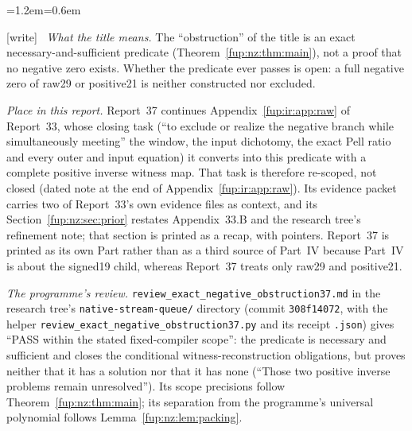 \documentclass[11pt,letterpaper]{article}
\theoremstyle{definition}\newtheorem{definition}[theorem]{Definition}
\theoremstyle{remark}\newtheorem{remark}[theorem]{Remark}
\newcommand{\wtag}{\textup{[write]}}
\newenvironment{writenote}{\par\smallskip\begin{list}{}{\leftmargin=1.2em\rightmargin=0.6em}\item[]\small\wtag\ }{\end{list}\smallskip}
\newcommand{\rw}[1]{\nolinkurl{#1}}%
\begin{document}
\begin{writenote}
\emph{What the title means.} The ``obstruction'' of the title is an exact necessary-and-sufficient predicate (Theorem~\ref{fup:nz:thm:main}), not a proof that no negative zero exists. Whether the predicate ever passes is open: a full negative zero of raw29 or positive21 is neither constructed nor excluded.

\emph{Place in this report.} Report~37 continues Appendix~\ref{fup:ir:app:raw} of Report~33, whose closing task (``to exclude or realize the negative branch while simultaneously meeting'' the window, the input dichotomy, the exact Pell ratio and every outer and input equation) it converts into this predicate with a complete positive inverse witness map. That task is therefore re-scoped, not closed (dated note at the end of Appendix~\ref{fup:ir:app:raw}). Its evidence packet carries two of Report~33's own evidence files as context, and its Section~\ref{fup:nz:sec:prior} restates Appendix~33.B and the research tree's refinement note; that section is printed as a recap, with pointers. Report~37 is printed as its own Part rather than as a third source of Part~IV because Part~IV is about the signed19 child, whereas Report~37 treats only raw29 and positive21.

\emph{The programme's review.} \rw{review_exact_negative_obstruction37.md} in the research tree's \rw{native-stream-queue/} directory (commit \texttt{308f14072}, with the helper \rw{review_exact_negative_obstruction37.py} and its receipt \rw{.json}) gives ``PASS within the stated fixed-compiler scope'': the predicate is necessary and sufficient and closes the conditional witness-reconstruction obligations, but proves neither that it has a solution nor that it has none (``Those two positive inverse problems remain unresolved''). Its scope precisions follow Theorem~\ref{fup:nz:thm:main}; its separation from the programme's universal polynomial follows Lemma~\ref{fup:nz:lem:packing}.


\end{writenote}
\end{document}
